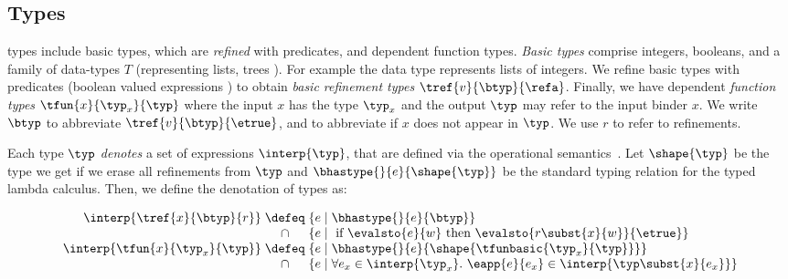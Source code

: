 \subsection{Types}

\corelan types include basic types, which are \emph{refined} with predicates,
and dependent function types.
%
\emph{Basic types} \btyp comprise integers, booleans, and a family of data-types
$T$ (representing lists, trees \etc).
%
For example the data type \tintlist represents lists of integers.
%
We refine basic types with predicates (boolean valued expressions ) to obtain
\emph{basic refinement types} $\tref{v}{\btyp}{\refa}$.
%
Finally, we have dependent \emph{function types} $\tfun{x}{\typ_x}{\typ}$
where the input $x$ has the type $\typ_x$ and the output $\typ$ may
refer to the input binder $x$.
%
We write $\btyp$ to abbreviate $\tref{v}{\btyp}{\etrue}$,
and  to abbreviate  if
$x$ does not appear in $\typ$.
%
We use $r$ to refer to refinements.


%
Each type $\typ$ \emph{denotes} a set of expressions $\interp{\typ}$,
that are defined via the operational semantics~\cite{Knowles10}.
%
Let $\shape{\typ}$ be the type we get if we erase all refinements
from $\typ$ and $\bhastype{}{e}{\shape{\typ}}$ be the
standard typing relation for the typed lambda calculus.
%
Then, we define the denotation of types as:

\[\arraycolsep=1.4pt
\begin{array}{rcl}
\interp{\tref{x}{\btyp}{r}}
  & \defeq &  \{e \mid  \bhastype{}{e}{\btyp} \} \\
  & \cap  &   \{e \mid
              \mbox{ if } \evalsto{e}{w}
              \mbox{ then } \evalsto{r\subst{x}{w}}{\etrue} \}\\
\interp{\tfun{x}{\typ_x}{\typ}}
   &\defeq &
    \{e \mid  \bhastype{}{e}{\shape{\tfunbasic{\typ_x}{\typ}}}\}\\
  & \cap  &
      \{e \mid \forall e_x \in \interp{\typ_x}.\ \eapp{e}{e_x} \in \interp{\typ\subst{x}{e_x}}
    \}
\end{array}
\]


